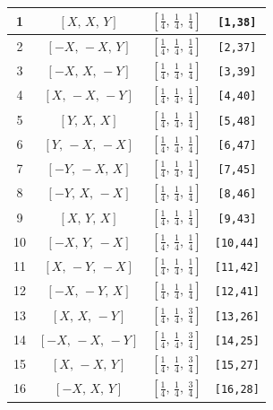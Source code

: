 \documentclass[fleqn,8pt]{jsarticle}
\begin{document}
\begin{longtable}{cccc}
1 & $\left[ X,\, X,\, Y \right]$ & $\left[ \frac{1}{4},\, \frac{1}{4},\, \frac{1}{4} \right]$ & {\tt [1,38]} \\ \hline
2 & $\left[ - X,\, - X,\, Y \right]$ & $\left[ \frac{1}{4},\, \frac{1}{4},\, \frac{1}{4} \right]$ & {\tt [2,37]} \\ \hline
3 & $\left[ - X,\, X,\, - Y \right]$ & $\left[ \frac{1}{4},\, \frac{1}{4},\, \frac{1}{4} \right]$ & {\tt [3,39]} \\ \hline
4 & $\left[ X,\, - X,\, - Y \right]$ & $\left[ \frac{1}{4},\, \frac{1}{4},\, \frac{1}{4} \right]$ & {\tt [4,40]} \\ \hline
5 & $\left[ Y,\, X,\, X \right]$ & $\left[ \frac{1}{4},\, \frac{1}{4},\, \frac{1}{4} \right]$ & {\tt [5,48]} \\ \hline
6 & $\left[ Y,\, - X,\, - X \right]$ & $\left[ \frac{1}{4},\, \frac{1}{4},\, \frac{1}{4} \right]$ & {\tt [6,47]} \\ \hline
7 & $\left[ - Y,\, - X,\, X \right]$ & $\left[ \frac{1}{4},\, \frac{1}{4},\, \frac{1}{4} \right]$ & {\tt [7,45]} \\ \hline
8 & $\left[ - Y,\, X,\, - X \right]$ & $\left[ \frac{1}{4},\, \frac{1}{4},\, \frac{1}{4} \right]$ & {\tt [8,46]} \\ \hline
9 & $\left[ X,\, Y,\, X \right]$ & $\left[ \frac{1}{4},\, \frac{1}{4},\, \frac{1}{4} \right]$ & {\tt [9,43]} \\ \hline
10 & $\left[ - X,\, Y,\, - X \right]$ & $\left[ \frac{1}{4},\, \frac{1}{4},\, \frac{1}{4} \right]$ & {\tt [10,44]} \\ \hline
11 & $\left[ X,\, - Y,\, - X \right]$ & $\left[ \frac{1}{4},\, \frac{1}{4},\, \frac{1}{4} \right]$ & {\tt [11,42]} \\ \hline
12 & $\left[ - X,\, - Y,\, X \right]$ & $\left[ \frac{1}{4},\, \frac{1}{4},\, \frac{1}{4} \right]$ & {\tt [12,41]} \\ \hline
13 & $\left[ X,\, X,\, - Y \right]$ & $\left[ \frac{1}{4},\, \frac{1}{4},\, \frac{3}{4} \right]$ & {\tt [13,26]} \\ \hline
14 & $\left[ - X,\, - X,\, - Y \right]$ & $\left[ \frac{1}{4},\, \frac{1}{4},\, \frac{3}{4} \right]$ & {\tt [14,25]} \\ \hline
15 & $\left[ X,\, - X,\, Y \right]$ & $\left[ \frac{1}{4},\, \frac{1}{4},\, \frac{3}{4} \right]$ & {\tt [15,27]} \\ \hline
16 & $\left[ - X,\, X,\, Y \right]$ & $\left[ \frac{1}{4},\, \frac{1}{4},\, \frac{3}{4} \right]$ & {\tt [16,28]} \\ \hline

\end{longtable}
\end{document}
